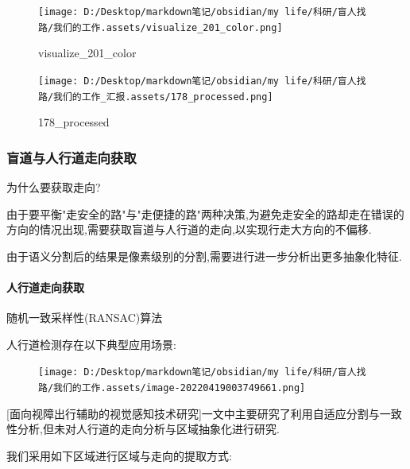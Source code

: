 \documentclass[]{article}
\let\oldparagraph\paragraph
\renewcommand{\paragraph}[1]{\oldparagraph{#1}\mbox{}}
\begin{document}
\begin{figure}
\centering
\texttt{[image: D:/Desktop/markdown笔记/obsidian/my life/科研/盲人找路/我们的工作.assets/visualize\_201\_color.png]}
\caption{visualize\_201\_color}
\end{figure}

\begin{figure}
\centering
\texttt{[image: D:/Desktop/markdown笔记/obsidian/my life/科研/盲人找路/我们的工作\_汇报.assets/178\_processed.png]}
\caption{178\_processed}
\end{figure}

\hypertarget{ux76f2ux9053ux4e0eux4ebaux884cux9053ux8d70ux5411ux83b7ux53d6}{%
\subsubsection{盲道与人行道走向获取}\label{ux76f2ux9053ux4e0eux4ebaux884cux9053ux8d70ux5411ux83b7ux53d6}}

为什么要获取走向?

由于要平衡"走安全的路"与"走便捷的路"两种决策,为避免走安全的路却走在错误的方向的情况出现,需要获取盲道与人行道的走向,以实现行走大方向的不偏移.

由于语义分割后的结果是像素级别的分割,需要进行进一步分析出更多抽象化特征.

\hypertarget{ux4ebaux884cux9053ux8d70ux5411ux83b7ux53d6}{%
\paragraph{人行道走向获取}\label{ux4ebaux884cux9053ux8d70ux5411ux83b7ux53d6}}

随机一致采样性(RANSAC)算法

人行道检测存在以下典型应用场景:

\begin{figure}
\centering
\texttt{[image: D:/Desktop/markdown笔记/obsidian/my life/科研/盲人找路/我们的工作.assets/image-20220419003749661.png]}
\caption{}
\end{figure}

{[}面向视障出行辅助的视觉感知技术研究{]}一文中主要研究了利用自适应分割与一致性分析,但未对人行道的走向分析与区域抽象化进行研究.

我们采用如下区域进行区域与走向的提取方式:
\end{document}
